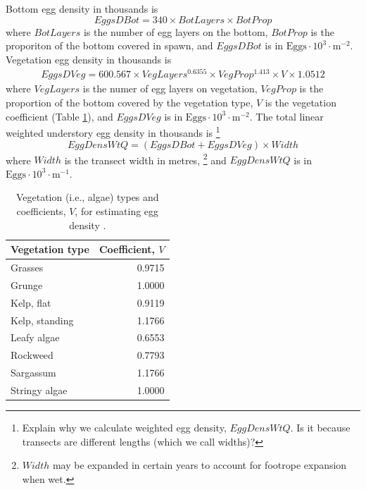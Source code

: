 \documentclass[12pt]{article}
\begin{document}
Bottom egg density in thousands is \citep{HaegeleEtal1979}
\begin{equation}
EggsDBot = 340 \times BotLayers \times BotProp
\label{eqEggDensUnderB}
\end{equation}
where $BotLayers$ is the number of egg layers on the bottom, $BotProp$ is the proporiton of the bottom covered in spawn, and $EggsDBot$ is in $\text{Eggs} \cdot 10^{3} \cdot \text{m}^{-2}$.
Vegetation egg density in thousands is \citep{Schweigert2005}
\begin{multline}
EggsDVeg = 600.567 \times VegLayers^{0.6355} \times VegProp^{1.413} \times V \times 1.0512
\label{eqEggDensUnderV}
\end{multline}
where $VegLayers$ is the numer of egg layers on vegetation, $VegProp$ is the proportion of the bottom covered by the vegetation type, $V$ is the vegetation coefficient (Table \ref{tabVegTypes}), and $EggsDVeg$ is in $\text{Eggs} \cdot 10^{3} \cdot \text{m}^{-2}$.
The total linear weighted understory egg density in thousands is%
\footnote{Explain why we calculate weighted egg density, $EggDensWtQ$.
Is it because transects are different lengths (which we call widths)?}
\begin{equation}
EggDensWtQ = \left( EggsDBot + EggsDVeg \right) \times Width
\label{eqEggDensWtUnder}
\end{equation}
where $Width$ is the transect width in metres,%
\footnote{$Width$ may be expanded in certain years to account for footrope expansion when wet.}
and $EggDensWtQ$ is in $\text{Eggs} \cdot 10^{3} \cdot \text{m}^{-1}$.

\begin{table}
\centering
\caption{Vegetation (i.e., algae) types and coefficients, $V$, for estimating egg density \citep{Schweigert2005}.}
\begin{tabular}{lr}
\toprule
Vegetation type & Coefficient, $V$\\
\midrule
Grasses & 0.9715 \\
Grunge & 1.0000 \\
Kelp, flat & 0.9119 \\
Kelp, standing & 1.1766 \\
Leafy algae & 0.6553 \\
Rockweed & 0.7793 \\
Sargassum & 1.1766 \\
Stringy algae & 1.0000 \\
\bottomrule
\end{tabular}
\label{tabVegTypes}
\end{table}
\end{document}
